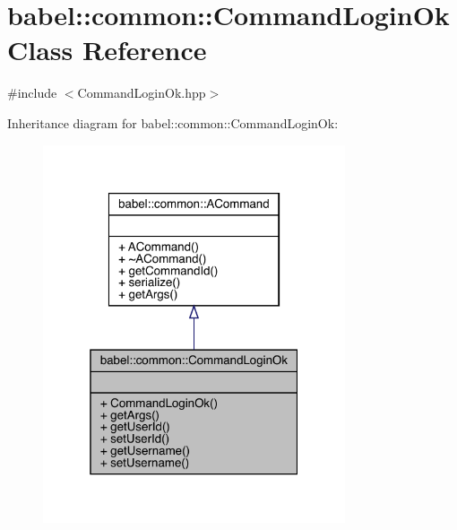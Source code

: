 \hypertarget{classbabel_1_1common_1_1_command_login_ok}{}\section{babel\+:\+:common\+:\+:Command\+Login\+Ok Class Reference}
\label{classbabel_1_1common_1_1_command_login_ok}


{\ttfamily \#include $<$Command\+Login\+Ok.\+hpp$>$}



Inheritance diagram for babel\+:\+:common\+:\+:Command\+Login\+Ok\+:\nopagebreak
\begin{figure}[H]
\begin{center}
\leavevmode
\includegraphics[width=253pt]{classbabel_1_1common_1_1_command_login_ok__inherit__graph}
\end{center}
\end{figure}



